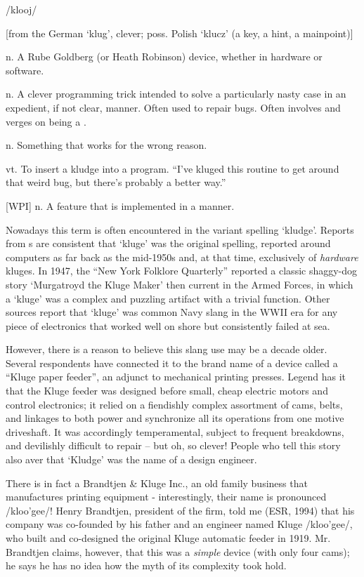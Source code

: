  /klooj/

[from the German `klug', clever; poss. Polish `klucz' (a key, a hint, a
mainpoint)]
\begin{inparaenum}
	\item n. A Rube Goldberg (or Heath Robinson) device, whether in hardware or
		software.
	\item n. A clever programming trick intended to solve a particularly nasty
		case in an expedient, if not clear, manner. Often used to repair bugs.
		Often involves  and verges on being a
		.
	\item n. Something that works for the wrong reason.
	\item vt. To insert a kludge into a program. ``I've kluged this routine to
		get around that weird bug, but there's probably a better way.''
	\item {[}WPI]  n. A feature that is implemented in a 
		manner.
\end{inparaenum}

Nowadays this term is often encountered in the variant spelling `kludge'.
Reports from s are consistent that `kluge' was the original
spelling, reported around computers as far back as the mid-1950s and, at that
time, exclusively of \textit{hardware} kluges. In 1947, the ``New York Folklore
Quarterly'' reported a classic shaggy-dog story `Murgatroyd the Kluge Maker'
then current in the Armed Forces, in which a `kluge' was a complex and puzzling
artifact with a trivial function. Other sources report that `kluge' was common
Navy slang in the WWII era for any piece of electronics that worked well on
shore but consistently failed at sea.

However, there is a reason to believe this slang use may be a decade older.
Several respondents have connected it to the brand name of a device called a
``Kluge paper feeder'', an adjunct to mechanical printing presses. Legend has
it that the Kluge feeder was designed before small, cheap electric motors and
control electronics; it relied on a fiendishly complex assortment of cams,
belts, and linkages to both power and synchronize all its operations from one
motive driveshaft. It was accordingly temperamental, subject to frequent
breakdowns, and devilishly difficult to repair -- but oh, so clever! People who
tell this story also aver that `Kludge' was the name of a design engineer.

There is in fact a Brandtjen \& Kluge Inc., an old family business that
manufactures printing equipment - interestingly, their name is pronounced
/kloo'gee/! Henry Brandtjen, president of the firm, told me (ESR, 1994) that
his company was co-founded by his father and an engineer named Kluge
/kloo'gee/, who built and co-designed the original Kluge automatic feeder in
1919. Mr. Brandtjen claims, however, that this was a \textit{simple} device
(with only four cams); he says he has no idea how the myth of its complexity
took hold.

